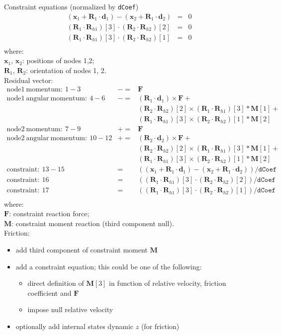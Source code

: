 \documentclass[10pt,fleqn,subeqn]{report}
\newcommand{\T}[1]{\bm{#1}}
\begin{document}
\noindent
Constraint equations (normalized by \texttt{dCoef})
\begin{eqnarray*}
	(\T x_1+\T R_1\cdot \T d_1) - (\T x_2+\T R_1\cdot \T d_2)& = & 0 \\
	(\T R_1\cdot \T R_{h1})[3]\cdot (\T R_2\cdot \T R_{h2})[2] & = & 0 \\
	(\T R_1\cdot \T R_{h1})[3]\cdot (\T R_2\cdot \T R_{h2})[1] & = & 0 \\
\end{eqnarray*}
where:\\
$\T x_1$, $\T x_2$: positions of nodes 1,2;\\
$\T R_{1}$, $\T R_{2}$: orientation of nodes 1, 2.\\

\noindent
Residual vector:
\begin{eqnarray*}
	\mathrm{node1\ momentum}:\ 1-3& -= & \T F\\
	\mathrm{node1\ angular\ momentum}:\ 4-6& -= & 
		(\T R_1\cdot \T d_1) \times \T F + \\
	&&	(\T R_2\cdot \T R_{h2})[2]\times 
		(\T R_1\cdot \T R_{h1})[3]*\T M[1] +\\
	&&	(\T R_1\cdot \T R_{h1})[3]\times
		(\T R_2\cdot \T R_{h2})[1]*\T M[2]\\
	\mathrm{node2\ momentum}:\ 7-9& += & \T F\\
	\mathrm{node2\ angular\ momentum}:\ 10-12& += & 
		(\T R_2\cdot \T d_2) \times \T F + \\
	&&	(\T R_2\cdot \T R_{h2})[2]\times 
		(\T R_1\cdot \T R_{h1})[3]*\T M[1] +\\
	&&	(\T R_1\cdot \T R_{h1})[3]\times
		(\T R_2\cdot \T R_{h2})[1]*\T M[2]\\
	\mathrm{constraint}:\ 13-15& = &  ((\T x_1+\T R_1\cdot \T d_1) - 
			(\T x_2+\T R_1\cdot \T d_2))/\texttt{dCoef}\\
	\mathrm{constraint}:\ 16& = &  ((\T R_1\cdot \T R_{h1})[3]\cdot 
			(\T R_2\cdot \T R_{h2})[2])/\texttt{dCoef}\\
	\mathrm{constraint}:\ 17& = &  ((\T R_1\cdot \T R_{h1})[3]\cdot 
			(\T R_2\cdot \T R_{h2})[1])/\texttt{dCoef}\\
\end{eqnarray*}
where:\\
$\T F$: constraint reaction force;\\
$\T M$: constraint moment reaction (third component null).\\

\noindent
Friction:
\begin{itemize}
\item add third component of constraint moment $\T M$
\item add a constraint equation; this could be one of the following:
	\begin{itemize}
	\item direct definition of $\T M[3]$ in function of relative velocity,
		friction coefficient and $\T F$
	\item impose null relative velocity
	\end{itemize}
\item optionally add internal states dynamic $z$ (for friction)
\end{itemize}
\end{document}
